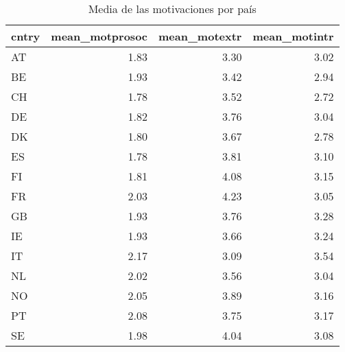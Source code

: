 \begin{table}

\caption{Media de las motivaciones por país}
\centering
\begin{tabular}[t]{lrrr}
\toprule
cntry & mean\_motprosoc & mean\_motextr & mean\_motintr\\
\midrule
AT & 1.83 & 3.30 & 3.02\\
BE & 1.93 & 3.42 & 2.94\\
CH & 1.78 & 3.52 & 2.72\\
DE & 1.82 & 3.76 & 3.04\\
DK & 1.80 & 3.67 & 2.78\\
\addlinespace
ES & 1.78 & 3.81 & 3.10\\
FI & 1.81 & 4.08 & 3.15\\
FR & 2.03 & 4.23 & 3.05\\
GB & 1.93 & 3.76 & 3.28\\
IE & 1.93 & 3.66 & 3.24\\
\addlinespace
IT & 2.17 & 3.09 & 3.54\\
NL & 2.02 & 3.56 & 3.04\\
NO & 2.05 & 3.89 & 3.16\\
PT & 2.08 & 3.75 & 3.17\\
SE & 1.98 & 4.04 & 3.08\\
\bottomrule
\end{tabular}
\end{table}
